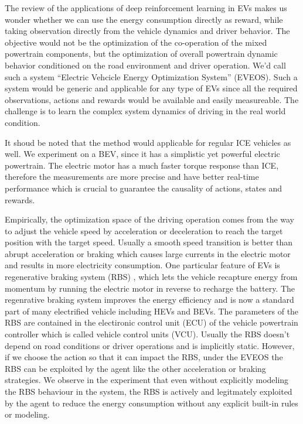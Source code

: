 \documentclass{article}
\begin{document}
The review of the applications of deep reinforcement learning in EVs makes us wonder whether we can use the energy consumption directly as reward, while taking observation directly from the vehicle dynamics and driver behavior. The objective would not be the optimization of the co-operation of the mixed powertrain components, but the optimization of overall powertrain dynamic behavior conditioned on the road environment and driver operation. We'd call such a system ``Electric Vehcicle Energy Optimization System'' (EVEOS). Such a system would be generic and applicable for any type of EVs since all the required observations, actions and rewards would be available and easily measureable. The challenge is to learn the complex system dynamics of driving in the real world condition.

It shoud be noted that the method would applicable for regular ICE vehicles as well. We experiment on a BEV, since it has a simplistic yet powerful electric powertrain. The electric motor has a much faster torque response than ICE, therefore the measurements are more precise and have better real-time performance which is crucial to guarantee the causality of actions, states and rewards.

Empirically, the optimization space of the driving operation comes from the way to adjust the vehicle speed by acceleration or deceleration to reach the target position with the target speed. Usually a smooth speed transition is better than abrupt acceleration or braking which causes large currents in the electric motor and results in more electricity consumption. One particular feature of EVs is regenerative braking system (RBS) \parencite{enwiki:1228286642}, which lets the vehicle recapture energy from momentum by running the electric motor in reverse to recharge the battery. The regenrative braking system improves the energy efficiency and is now a standard part of many electrified vehicle including HEVs and BEVs. The parameters of the RBS are contained in the electironic control unit (ECU) of the vehicle powertrain controller which is called vehicle control units (VCU). Usually the RBS doesn't depend on road conditions or driver operations and is implicitly static. However, if we choose the action so that it can impact the RBS, under the EVEOS the RBS can be exploited by the agent like the other acceleration or braking strategies. We observe in the experiment that even without explicitly modeling the RBS behaviour in the system, the RBS is actively and legitmately exploited by the agent to reduce the energy consumption without any explicit built-in rules or modeling.
\end{document}

